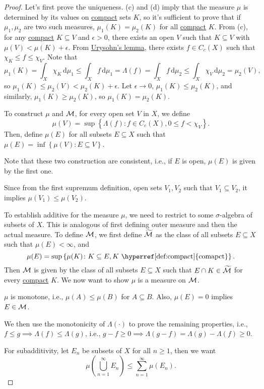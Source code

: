 \begin{proof}\let\qed\relax
	Let's first prove the uniqueness. (c) and (d) imply that the measure \(\mu \) is determined by its values on \hyperref[def:compact]{compact} sets \(K\), so it's sufficient to prove that if \(\mu _1, \mu _2\) are two such measures, \(\mu _1(K) = \mu _2(K)\) for all \hyperref[def:compact]{compact} \(K\). From (c), for any \hyperref[def:compact]{compact} \(K \subseteq V\) and \(\epsilon > 0\), there exists an open \(V\) such that \(K \subseteq V\) with \(\mu (V) < \mu (K) + \epsilon \). From \hyperref[thm:Urysohn-lemma]{Urysohn's lemma}, there exists \(f\in C_c(X)\) such that \(\chi _K \leq f \leq \chi _V\). Note that
	\[
		\mu _1(K)
		= \int_{X} \chi _K \,\mathrm{d}\mu _1
		\leq \int _X f\,\mathrm{d} \mu _1
		= \Lambda (f)
		= \int _X f\,\mathrm{d} \mu _2
		\leq \int _X \chi _V \,\mathrm{d} \mu _2
		= \mu _2(V),
	\]
	so \(\mu _1(K) \leq \mu _2(V) < \mu _2(K) + \epsilon \). Let \(\epsilon \to 0\), \(\mu _1(K) \leq \mu _2(K)\), and similarly, \(\mu _1(K) \geq \mu _2(K)\), so \(\mu _1(K) = \mu _2(K)\).

	To construct \(\mu \) and \(\mathcal{\MakeUppercase{m}} \), for every open set \(V\) in \(X\), we define
	\[
		\mu (V) = \sup \left\{ \Lambda (f) \colon f\in C_c(X), 0 \leq f < \chi _V \right\}.
	\]
	Then, define \(\mu (E)\) for all subsets \(E \subseteq X\) such that \(\mu (E) = \inf \left\{ \mu (V)\colon E \subseteq V \right\} \).

	\begin{note}
		Note that these two construction are consistent, i.e., if \(E\) is open, \(\mu (E)\) is given by the first one.
	\end{note}
	\begin{explanation}
		Since from the first supremum definition, open sets \(V_1, V_2\) such that \(V_1 \subseteq V_2\), it implies \(\mu (V_1) \leq \mu (V_2)\).
	\end{explanation}

	To establish additive for the measure \(\mu \), we need to restrict to some \(\sigma \)-algebra of subsets of \(X\). This is analogous of first defining outer measure and then the actual measure. To define \(\mathcal{\MakeUppercase{m}} \), we first define \(\widetilde{\mathcal{\MakeUppercase{m}}}\) as the class of all subsets \(E \subseteq X\) such that \(\mu (E) < \infty \), and
	\[
		\mu (E) = \sup \left\{ \mu (K) \colon K \subseteq E, K \text{ \hyperref[def:compact]{comapct}}  \right\}.
	\]
	Then \(\mathcal{\MakeUppercase{m}} \) is given by the class of all subsets \(E \subseteq X\) such that \(E \cap K \in \widetilde{\mathcal{\MakeUppercase{m}} }\) for every \hyperref[def:compact]{compact} \(K\). We now want to show \(\mu \) is a measure on \(\mathcal{\MakeUppercase{m}} \).
	\begin{note}
		\(\mu \) is monotone, i.e., \(\mu (A) \leq \mu (B)\) for \(A \subseteq B\). Also, \(\mu (E) = 0\) implies \(E\in \mathcal{\MakeUppercase{m}} \).
	\end{note}
	We then use the monotonicity of \(\Lambda (\cdot)\) to prove the remaining properties, i.e., \(f\leq g \implies \Lambda (f) \leq \Lambda (g)\), i.e., \(g-f \geq 0 \implies \Lambda (g - f) = \Lambda (g) - \Lambda (f) \geq 0\).

	For subadditivity, let \(E_n\) be subsets of \(X\) for all \(n \geq 1\), then we want
	\[
		\mu \left( \bigcup_{n=1}^{\infty} E_n \right) \leq \sum_{n=1}^{\infty} \mu (E_n).
	\]
\end{proof}